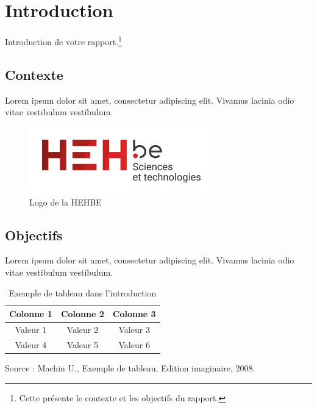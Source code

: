 \section{Introduction}
Introduction de votre rapport.\footnote{Cette présente le contexte et les objectifs du rapport.}

\subsection{Contexte}
Lorem ipsum dolor sit amet, consectetur adipiscing elit. Vivamus lacinia odio vitae vestibulum vestibulum.

\begin{figure}[!ht]
    \centering
    \includegraphics[width=8cm]{img/logo_hehbe_tech.png}
    \caption{Logo de la HEHBE}
    \label{fig:example_figure}
\end{figure}

\subsection{Objectifs}
Lorem ipsum dolor sit amet, consectetur adipiscing elit. Vivamus lacinia odio vitae vestibulum vestibulum.

\begin{table}[!ht]
    \centering
    \begin{tabular}{|c|c|c|}
        \hline
        Colonne 1 & Colonne 2 & Colonne 3 \\
        \hline
        Valeur 1 & Valeur 2 & Valeur 3 \\
        \hline
        Valeur 4 & Valeur 5 & Valeur 6 \\
        \hline
    \end{tabular}
    \caption{Exemple de tableau dans l'introduction}
    \label{tab:example_table}
    \vspace{0.2cm} %
    Source :  Machin U., Exemple de tableau, Edition imaginaire, 2008.
\end{table}


